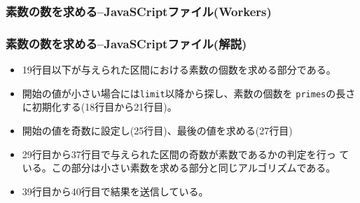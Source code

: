 \begin{frame}[containsverbatim]
 \frametitle{素数の数を求める--JavaSCriptファイル(Workers)}
\end{frame}
\begin{frame}[containsverbatim]
 \frametitle{素数の数を求める--JavaSCriptファイル(解説)}
 \begin{itemize}
  \item 19行目以下が与えられた区間における素数の個数を求める部分である。
  \item 開始の値が小さい場合には\Verb+limit+以降から探し、素数の個数を
        \Verb+primes+の長さに初期化する(18行目から21行目)。
  \item 開始の値を奇数に設定し(25行目)、最後の値を求める(27行目)
  \item 29行目から37行目で与えられた区間の奇数が素数であるかの判定を行っ
        ている。この部分は小さい素数を求める部分と同じアルゴリズムである。
  \item 39行目から40行目で結果を送信している。
 \end{itemize}
\end{frame}

